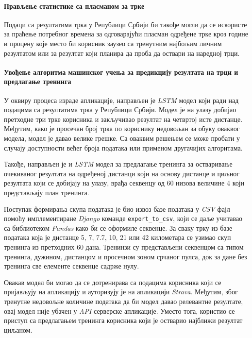 \documentclass[12pt,oneside]{memoir}
\begin{document}
\paragraph{Прављење статистике са пласманом за трке}

Подаци са резултатима трка у Републици Србији би такође могли да се искористе за праћење потребног времена за одговарајући пласман одређене трке кроз године и процену које место би корисник заузео са тренутним најбољим личним резултатом или за резултат који планира да проба да оствари на наредној трци.


\paragraph{Увођење алгоритма машинског учења за предикцију резултата на трци и предлагање тренинга}

У оквиру процеса израде апликације, направљен је \textit{LSTM} модел који ради над подацима са резултатима трка у Републици Србији. Модел је на улазу добијао претходне три трке корисника и закључивао резултат на четвртој исте дистанце. Међутим, како је просечан број трка по кориснику недовољан за обуку оваквог модела, модел је давао велике грешке. Са оваквим решењем се може пробати у случају доступности већег броја података или применом другачијих алгоритама. 

Такође, направљен је и \textit{LSTM} модел за предлагање тренинга за остваривање очекиваног резултата на одређеној дистанци који на основу дистанце и циљног резултата који се добијају на улазу, врађа секвенцу од 60 низова величине 4 који представљају план тренинга. 

Поступак формирања скупа података је био извоз базе података у \textit{CSV} фајл помоћу имплементиране \textit{Django} команде \texttt{export\_to\_csv}, који се даље учитавао са библиотеком \textit{Pandas} како би се оформиле секвенце. За сваку трку из базе података која је дистанце 5, 7, 7.7, 10, 21 или 42 километара се узимао скуп тренинга из претходних 60 дана. Тренинзи су представљени секвенцом са типом тренинга, дужином, дистанцом и просечном зоном срчаног пулса, док за дане без тренинга све елементе секвенце садрже нулу.

Овакав модел би могао да се дотренирава са подацима корисника који се пријављују на апликацију и ауторизују је на апликацији \textit{Strava}. Међутим, због тренутне недовољне количине података да би модел давао релевантне резултате, овај модел није убачен у \textit{API} серверске апликације. Уместо тога, користио се приступ са предлагањем тренинга корисника који је остварио најближи резултат циљаном.
\end{document}
